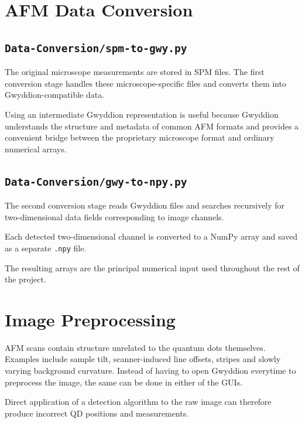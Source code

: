 \documentclass[11pt,a4paper]{article}
\begin{document}
\section{AFM Data Conversion}

\subsection{\texttt{Data-Conversion/spm-to-gwy.py}}

The original microscope measurements are stored in SPM files. The first conversion stage handles these microscope-specific files and converts them into Gwyddion-compatible data.

Using an intermediate Gwyddion representation is useful because Gwyddion understands the structure and metadata of common AFM formats and provides a convenient bridge between the proprietary microscope format and ordinary numerical arrays.


\subsection{\texttt{Data-Conversion/gwy-to-npy.py}}

The second conversion stage reads Gwyddion files and searches recursively for two-dimensional data fields corresponding to image channels.

Each detected two-dimensional channel is converted to a NumPy array and saved as a separate \texttt{.npy} file.

The resulting arrays are the principal numerical input used throughout the rest of the project.


\section{Image Preprocessing}

AFM scans contain structure unrelated to the quantum dots themselves. Examples include sample tilt, scanner-induced line offsets, stripes and slowly varying background curvature.
Instead of having to open Gwyddion everytime to preprocess the image, the same can be done in either of the GUIs.

Direct application of a detection algorithm to the raw image can therefore produce incorrect QD positions and measurements.
\end{document}
